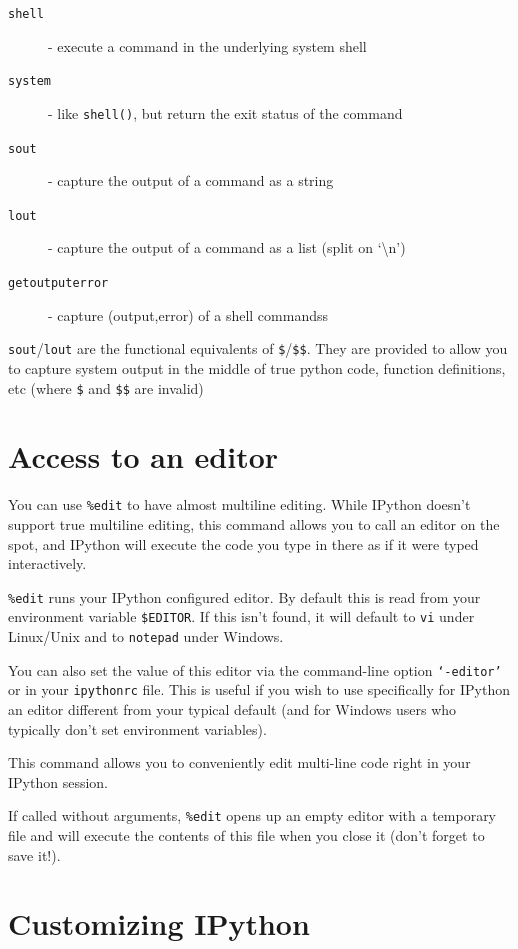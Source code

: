 \begin{description}
\item [{\texttt{shell}}] - execute a command in the underlying system shell 
\item [{\texttt{system}}] - like \texttt{shell()}, but return the exit
status of the command
\item [{\texttt{sout}}] - capture the output of a command as a string
\item [{\texttt{lout}}] - capture the output of a command as a list (split
on `\textbackslash{}n')
\item [{\texttt{getoutputerror}}] - capture (output,error) of a shell commandss
\end{description}
\texttt{sout}/\texttt{lout} are the functional equivalents of \texttt{\$}/\texttt{\$\$}.
They are provided to allow you to capture system output in the middle
of true python code, function definitions, etc (where \texttt{\$}
and \texttt{\$\$} are invalid)


\section{Access to an editor}

You can use \texttt{\%edit} to have almost multiline editing. While
IPython doesn't support true multiline editing, this command allows
you to call an editor on the spot, and IPython will execute the code
you type in there as if it were typed interactively. 

\texttt{\%edit} runs your IPython configured editor. By default this
is read from your environment variable \texttt{\$EDITOR}. If this
isn't found, it will default to \texttt{vi} under Linux/Unix and to
\texttt{notepad} under Windows. 

You can also set the value of this editor via the command-line option
\texttt{`-editor'} or in your \texttt{ipythonrc} file. This is useful
if you wish to use specifically for IPython an editor different from
your typical default (and for Windows users who typically don't set
environment variables).

This command allows you to conveniently edit multi-line code right
in your IPython session.

If called without arguments, \texttt{\%edit} opens up an empty editor
with a temporary file and will execute the contents of this file when
you close it (don't forget to save it!). 


\section{Customizing IPython}



